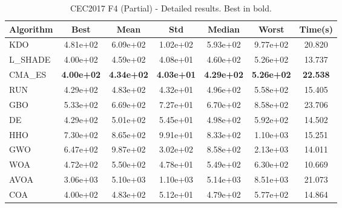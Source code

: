 \begin{table}[H]
\centering\small
\caption{CEC2017 F4 (Partial) - Detailed results. Best in bold.}
\label{tab:cec2017_F4}
\begin{tabular}{lcccccc}
\toprule
\textbf{Algorithm} & \textbf{Best} & \textbf{Mean} & \textbf{Std} & \textbf{Median} & \textbf{Worst} & \textbf{Time(s)} \\
\midrule
KDO & 4.81e+02 & 6.09e+02 & 1.02e+02 & 5.93e+02 & 9.77e+02 & 20.820 \\
L_SHADE & 4.00e+02 & 4.59e+02 & 4.08e+01 & 4.60e+02 & 5.26e+02 & 13.737 \\
CMA_ES & \textbf{4.00e+02} & \textbf{4.34e+02} & \textbf{4.03e+01} & \textbf{4.29e+02} & \textbf{5.26e+02} & \textbf{22.538} \\
RUN & 4.29e+02 & 4.83e+02 & 4.32e+01 & 4.96e+02 & 5.58e+02 & 15.405 \\
GBO & 5.33e+02 & 6.69e+02 & 7.27e+01 & 6.70e+02 & 8.58e+02 & 23.706 \\
DE & 4.29e+02 & 5.01e+02 & 5.45e+01 & 4.98e+02 & 5.92e+02 & 14.502 \\
HHO & 7.30e+02 & 8.65e+02 & 9.91e+01 & 8.33e+02 & 1.10e+03 & 15.251 \\
GWO & 6.47e+02 & 9.87e+02 & 3.02e+02 & 8.58e+02 & 2.13e+03 & 14.011 \\
WOA & 4.72e+02 & 5.50e+02 & 4.78e+01 & 5.49e+02 & 6.30e+02 & 10.669 \\
AVOA & 3.06e+03 & 5.10e+03 & 1.10e+03 & 5.14e+03 & 8.51e+03 & 21.073 \\
COA & 4.00e+02 & 4.83e+02 & 5.12e+01 & 4.79e+02 & 5.77e+02 & 14.864 \\
\bottomrule
\end{tabular}
\end{table}
